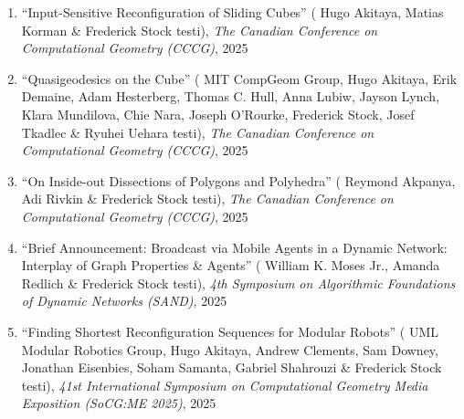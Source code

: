 \documentclass[letterpaper,11pt]{article}
\makeatletter
\newcommand{\publication}[6]{
  \item ``#1'' %
   (\ignorespaces#2 testi), %
     \emph{#3}, %
      #4%


}
\newcommand{\pdficon}{\faFilePdf}
\newcommand{\codeicon}{\faCode}
\newcommand{\doilabel}{\texttt{DOI}}
\makeatother
\begin{document}
    \begin{enumerate}
    \setcounter{enumi}{\value{pubnum}}
      
        \publication
          {Input-Sensitive Reconfiguration of Sliding Cubes}
          {
 Hugo Akitaya, Matias Korman \& Frederick Stock}
          {The Canadian Conference on Computational Geometry (CCCG)}
          {2025}
          {%
\href{fred-stock.github.io/docstore/Input-Sensitive-Sliding-Cubes-CCCG.pdf}{\pdficon}%
%
%
          }
          {1}
 \vspace{-.5em}  
      
        \publication
          {Quasigeodesics on the Cube}
          {
 MIT CompGeom Group, Hugo Akitaya, Erik Demaine, Adam Hesterberg, Thomas C. Hull, Anna Lubiw, Jayson Lynch, Klara Mundilova, Chie Nara, Joseph O'Rourke, Frederick Stock, Josef Tkadlec \& Ryuhei Uehara}
          {The Canadian Conference on Computational Geometry (CCCG)}
          {2025}
          {%
\href{fred-stock.github.io/docstore/quasigeodesics-cube-cccg.pdf}{\pdficon}%
%
%
          }
          {2}
 \vspace{-.5em}  
      
        \publication
          {On Inside-out Dissections of Polygons and Polyhedra}
          {
 Reymond Akpanya, Adi Rivkin \& Frederick Stock}
          {The Canadian Conference on Computational Geometry (CCCG)}
          {2025}
          {%
\href{fred-stock.github.io/docstore/inside-out-dissections-cccg.pdf}{\pdficon}%
%
\quad\href{https://doi.org/10.48550/arXiv.2411.06584}{\doilabel}%
          }
          {3}
 \vspace{-.5em}  
      
        \publication
          {Brief Announcement: Broadcast via Mobile Agents in a Dynamic Network: Interplay of Graph Properties \& Agents}
          {
 William K. Moses Jr., Amanda Redlich \& Frederick Stock}
          {4th Symposium on Algorithmic Foundations of Dynamic Networks (SAND)}
          {2025}
          {%
\href{fred-stock.github.io/docstore/Broadcast_via_Mobile_Agents_in_a_Dynamic_Network-sand.pdf}{\pdficon}%
%
\quad\href{https://doi.org/10.4230/LIPIcs.SAND.2025.17}{\doilabel}%
          }
          {4}
 \vspace{-.5em}  
      
        \publication
          {Finding Shortest Reconfiguration Sequences for Modular Robots}
          {
 UML Modular Robotics Group, Hugo Akitaya, Andrew Clements, Sam Downey, Jonathan Eisenbies, Soham Samanta, Gabriel Shahrouzi \& Frederick Stock}
          {41st International Symposium on Computational Geometry Media Exposition (SoCG:ME 2025)}
          {2025}
          {%
\href{fred-stock.github.io/docstore/Finding-Shortest-Reconfig-Sequences-SOCGME.pdf}{\pdficon}%
\quad\href{https://github.com/Modular-Robotics-Group/modular-robotics}{\codeicon}%
\quad\href{https://doi.org/10.4230/LIPIcs.SoCG.2025.85}{\doilabel}%
          }
          {5}
 \vspace{-.5em}  
      

\end{enumerate}
\end{document}
